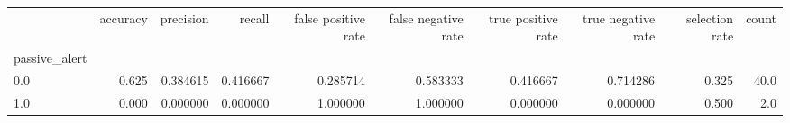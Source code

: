 \begin{tabular}{lrrrrrrrrr}
\toprule
{} &  accuracy &  precision &    recall &  false positive rate &  false negative rate &  true positive rate &  true negative rate &  selection rate &  count \\
passive\_alert &           &            &           &                      &                      &                     &                     &                 &        \\
\midrule
0.0           &     0.625 &   0.384615 &  0.416667 &             0.285714 &             0.583333 &            0.416667 &            0.714286 &           0.325 &   40.0 \\
1.0           &     0.000 &   0.000000 &  0.000000 &             1.000000 &             1.000000 &            0.000000 &            0.000000 &           0.500 &    2.0 \\
\bottomrule
\end{tabular}
